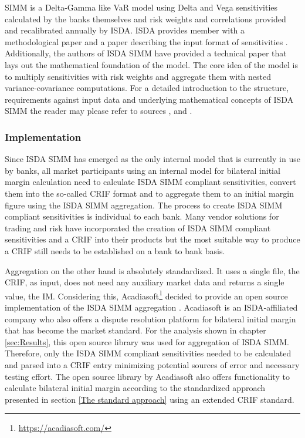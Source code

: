 \documentclass[../Thesis_AHoecherl.tex]{subfiles}
\begin{document}
    SIMM is a Delta-Gamma like \gls{VaR} model using Delta and Vega sensitivities calculated by the banks themselves and risk weights and correlations provided and recalibrated annually by \gls{ISDA}. \gls{ISDA} provides member with a methodological paper \cite{SIMM} and a paper describing the input format of sensitivities \cite{RiskDataStandard}.
    Additionally, the authors of \gls{ISDA SIMM} have provided a technical paper \cite{SIMM_technical_paper} that lays out the mathematical foundation of the model. 
    The core idea of the model is to multiply sensitivities with risk weights and aggregate them with nested variance-covariance computations. For a detailed introduction to the structure, requirements against input data and underlying mathematical concepts of \gls{ISDA SIMM} the reader may please refer to sources \cite{SIMM}, \cite{RiskDataStandard} and \cite{SIMM_technical_paper}.

    \subsubsection{Implementation}\label{sec:ISDA SIMM implementation}
    Since \gls{ISDA SIMM} has emerged as the only internal model that is currently in use by banks, all market participants using an internal model for bilateral initial margin calculation need to calculate \gls{ISDA SIMM} compliant sensitivities, convert them into the so-called \gls{CRIF} format and to aggregate them to an initial margin figure using the \gls{ISDA SIMM} aggregation.
    The process to create \gls{ISDA SIMM} compliant sensitivities is individual to each bank. Many vendor solutions for trading and risk have incorporated the creation of \gls{ISDA SIMM} compliant sensitivities and a \gls{CRIF} into their products but the most suitable way to produce a \gls{CRIF} still needs to be established on a bank to bank basis.
    
    Aggregation on the other hand is absolutely standardized. It uses a single file, the \gls{CRIF}, as input, does not need any auxiliary market data and returns a single value, the IM. 
    Considering this, Acadiasoft\footnote{\url{https://acadiasoft.com/}} decided to provide an open source implementation of the \gls{ISDA SIMM} aggregation \cite{simm-lib}. Acadiasoft is an \gls{ISDA}-affiliated company who also offers a dispute resolution platform for bilateral initial margin that has become the market standard.
    For the analysis shown in chapter \ref{sec:Results}, this open source library was used for aggregation of \gls{ISDA SIMM}. 
    Therefore, only the \gls{ISDA SIMM} compliant sensitivities needed to be calculated and parsed into a \gls{CRIF} entry minimizing potential sources of error and necessary testing effort. The open source library by Acadiasoft also offers functionality to calculate bilateral initial margin according to the standardized approach presented in section \ref{The standard approach} using an extended \gls{CRIF} standard.
\end{document}
